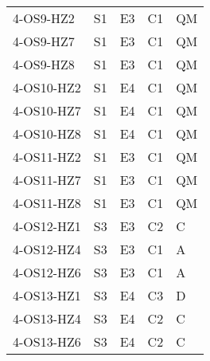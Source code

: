 \begin{center}
\begin{tabular}{l|l|l|l|l}
4-OS9-HZ2		& S1		& E3					& C1				& QM	\\
4-OS9-HZ7		& S1		& E3					& C1				& QM	\\
4-OS9-HZ8		& S1		& E3					& C1				& QM	\\

4-OS10-HZ2		& S1		& E4					& C1				& QM	\\
4-OS10-HZ7		& S1		& E4					& C1				& QM	\\
4-OS10-HZ8		& S1		& E4					& C1				& QM	\\

4-OS11-HZ2		& S1		& E3					& C1				& QM	\\
4-OS11-HZ7		& S1		& E3					& C1				& QM	\\
4-OS11-HZ8		& S1		& E3					& C1				& QM	\\

4-OS12-HZ1		& S3		& E3					& C2				& C	\\
4-OS12-HZ4		& S3		& E3					& C1				& A	\\
4-OS12-HZ6		& S3		& E3					& C1				& A	\\

4-OS13-HZ1		& S3		& E4					& C3 				& D	\\
4-OS13-HZ4		& S3		& E4					& C2				& C	\\
4-OS13-HZ6		& S3		& E4					& C2				& C	\\



\end{tabular}
\end{center}
